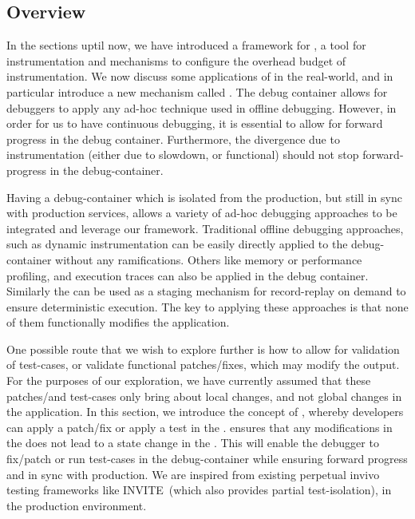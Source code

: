 \subsection{Overview}
\label{sec:guided_overview}


In the sections uptil now, we have introduced a framework for \livedebugging, a tool for instrumentation and mechanisms to configure the overhead budget of instrumentation. 
We now discuss some applications of \livedebugging in the real-world, and in particular introduce a new mechanism called \activedebugging.
The debug container allows for debuggers to apply any ad-hoc technique used in offline debugging. 
However, in order for us to have continuous debugging, it is essential to allow for forward progress in the debug container. 
Furthermore, the divergence due to instrumentation (either due to slowdown, or functional) should not stop forward-progress in the debug-container.

Having a debug-container which is isolated from the production, but still in sync with production services, allows a variety of ad-hoc debugging approaches to be integrated and leverage our framework.
Traditional offline debugging approaches, such as dynamic instrumentation can be easily directly applied to the debug-container without any ramifications. 
Others like memory or performance profiling, and execution traces can also be applied in the debug container.
Similarly the \debugcontainer can be used as a staging mechanism for record-replay on demand to ensure deterministic execution.
The key to applying these approaches is that none of them functionally modifies the application.

One possible route that we wish to explore further is how to allow for validation of test-cases, or validate functional patches/fixes, which may modify the output.
For the purposes of our exploration, we have currently assumed that these patches/and test-cases only bring about local changes, and not global changes in the application.
In this section, we introduce the concept of \activedebugging, whereby developers can apply a patch/fix or apply a test in the \debugcontainer.
\activedebugging ensures that any modifications in the \debugcontainer does not lead to a state change in the \productioncontainer.
This will enable the debugger to fix/patch or run test-cases in the debug-container while ensuring forward progress and in sync with production. 
We are inspired from existing perpetual invivo testing frameworks like INVITE~\cite{invivo}(which also provides partial test-isolation), in the production environment.

